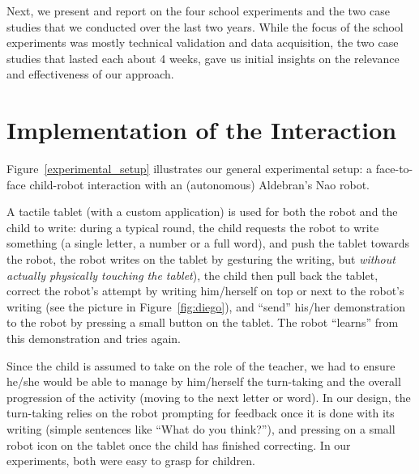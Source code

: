 \documentclass{article}
\begin{document}
Next, we present and report on the four school experiments and the two case
studies that we conducted over the last two years. While the focus of the school
experiments was mostly technical validation and data acquisition, the two case
studies that lasted each about 4 weeks, gave us initial insights on the
relevance and effectiveness of our approach.

\section{Implementation of the Interaction}

Figure~\ref{experimental_setup} illustrates our general experimental setup: a
face-to-face child-robot interaction with an (autonomous) Aldebran's Nao robot.

A tactile tablet (with a custom application) is used for both the robot and the
child to write: during a typical round, the child requests the robot to write
something (a single letter, a number or a full word), and push the tablet
towards the robot, the robot writes on the tablet by gesturing the writing, but
\emph{without actually physically touching the tablet}), the child then pull
back the tablet, correct the robot's attempt by writing him/herself on top or
next to the robot's writing (see the picture in Figure~\ref{fig:diego}), and
``send'' his/her demonstration to the robot by pressing a small button on the
tablet. The robot ``learns'' from this demonstration and tries again.

Since the child is assumed to take on the role of the teacher, we had to ensure
he/she would be able to manage by him/herself the turn-taking and the overall
progression of the activity (moving to the next letter or word). In our design,
the turn-taking relies on the robot prompting for feedback once it is done with
its writing (simple sentences like ``What do you think?''), and pressing on a
small robot icon on the tablet once the child has finished correcting. In our
experiments, both were easy to grasp for children.
\end{document}
